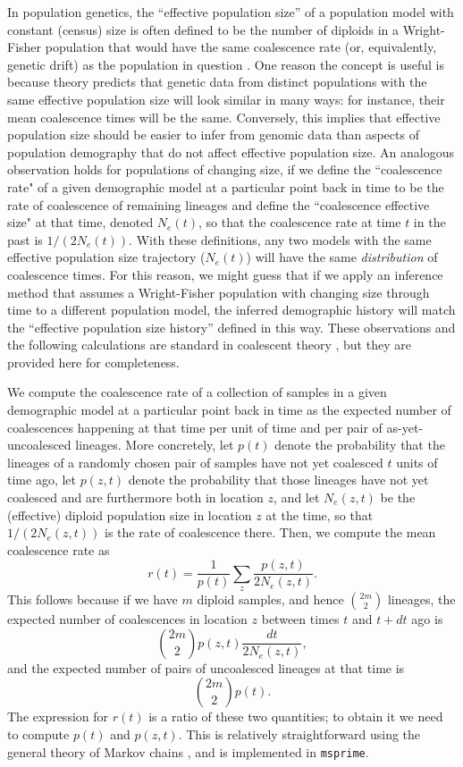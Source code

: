 \documentclass[12pt,halfline,a4paper]{ouparticle}
\begin{document}
In population genetics, the ``effective population size''
of a population model with constant (census) size
is often defined to be the number of diploids in a Wright-Fisher population
that would have the same coalescence rate (or, equivalently, genetic drift)
as the population in question \citep[reviewed in][]{crow1988inbreeding}.
One reason the concept is useful
is because theory predicts that genetic data from distinct populations
with the same effective population size will look similar in many ways:
for instance, their mean coalescence times will be the same.
Conversely, this implies that effective population size
should be easier to infer from genomic data than aspects of population demography
that do not affect effective population size.
An analogous observation holds for populations of changing size,
if we define the ``coalescence rate" of a given demographic model
at a particular point back in time
to be the rate of coalescence of remaining lineages
and define the ``coalescence effective size" at that time,
denoted $N_e(t)$, so that the coalescence rate at time $t$ in the past
is $1/(2N_e(t))$.
With these definitions, any two models with the same effective population size trajectory ($N_e(t)$)
will have the same \emph{distribution} of coalescence times.
For this reason,
we might guess that if we apply an inference method
that assumes a Wright-Fisher population with changing size through time
to a different population model,
the inferred demographic history will match the ``effective population size history''
defined in this way.
These observations and the following calculations are standard in coalescent theory
\citep[see e.g.,][]{wakeley2005coalescent},
but they are provided here for completeness.

We compute the coalescence rate of a collection of samples in a given demographic model
at a particular point back in time
as the expected number of coalescences happening at that time
per unit of time and per pair of as-yet-uncoalesced lineages.
More concretely,
let $p(t)$ denote the probability that the lineages of a randomly chosen pair of samples
have not yet coalesced $t$ units of time ago,
let $p(z, t)$ denote the probability that those lineages have not yet coalesced
and are furthermore both in location $z$,
and let $N_e(z,t)$ be the (effective) diploid population size in location $z$ at the time,
so that $1/(2 N_e(z,t))$ is the rate of coalescence there.
Then, we compute the mean coalescence rate as
$$  r(t)  = \frac{1}{p(t)} \sum_z \frac{p(z,t)}{2N_e(z,t)} . $$
This follows because if we have $m$ diploid samples, and hence $\binom{2m}{2}$ lineages,
the expected number of coalescences in location $z$ between times $t$ and $t+dt$ ago is
$$
\binom{2m}{2} p(z,t) \frac{ dt }{ 2 N_e(z,t) },
$$
and the expected number of pairs of uncoalesced lineages at that time is
$$
\binom{2m}{2} p(t) .
$$
The expression for $r(t)$ is a ratio of these two quantities;
to obtain it we need to compute $p(t)$ and $p(z,t)$.
This is relatively straightforward
using the general theory of Markov chains \citep[e.g,.][]{kemeny2012denumerable},
and is implemented in \texttt{msprime}.
\end{document}

